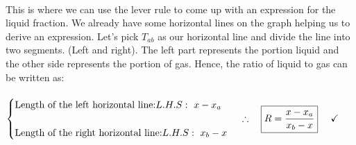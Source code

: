 \documentclass[fleqn]{article}
\begin{document}
\begin{enumerate}
      \textcolor{hwColor}{
        \\
        This is where we can use the lever rule to come up with an expression for the liquid fraction. 
        We already have some horizontal lines on the graph helping us to derive an expression. Let's pick $T_{ab}$ 
        as our horizontal line and divide the line into two segments. (Left and right). The left part represents the portion liquid and the other
        side represents the portion of gas. Hence, the ratio of liquid to gas can be written as:
        \\
        \\
        $
          \begin{cases}
            \text{Length of the left horizontal line:} L.H.S: ~ x-x_a
            \\
            \\
            \text{Length of the right horizontal line:} L.H.S: ~ x_b-x
          \end{cases}
          \\
          \\
          \\
          \therefore ~~~ \boxed{
            R=\dfrac{x-x_a}{x_b-x} 
          } ~~~~ \checkmark
        $ 
      }

  \end{enumerate}
\end{document}
